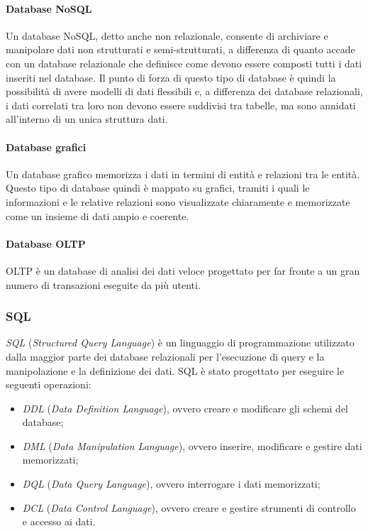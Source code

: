   \paragraph{Database NoSQL}
  Un database NoSQL, detto anche non relazionale, consente di archiviare e manipolare dati non strutturati e 
  semi-strutturati, a differenza di quanto accade con un database relazionale che definisce come devono essere 
  composti tutti i dati inseriti nel database. Il punto di forza di questo tipo di database è quindi la possibilità
  di avere modelli di dati flessibili e, a differenza dei database relazionali, i dati correlati tra loro non devono essere
  suddivisi tra tabelle, ma sono annidati all'interno di un unica struttura dati.
  \paragraph{Database grafici}
  Un database grafico memorizza i dati in termini di entità e relazioni tra le entità. Questo tipo di database quindi 
  è mappato su grafici, tramiti i quali le informazioni e le relative relazioni sono visualizzate chiaramente e memorizzate
  come un insieme di dati ampio e coerente.
  \paragraph{Database OLTP}
  OLTP è un database di analisi dei dati veloce progettato per far fronte a un gran numero di transazioni
  eseguite da più utenti.

  \subsubsection{SQL}
  \textit{SQL} (\textit{Structured Query Language}) è un linguaggio di programmazione utilizzato dalla maggior parte
  dei database relazionali per l'esecuzione di query e la manipolazione e la definizione dei dati.
  SQL è stato progettato per eseguire le seguenti operazioni:
  \begin{itemize}
    \item \textit{DDL} (\textit{Data Definition Language}), ovvero creare e modificare gli schemi del database;
    \item \textit{DML} (\textit{Data Manipulation Language}), ovvero inserire, modificare e gestire dati memorizzati;
    \item \textit{DQL} (\textit{Data Query Language}), ovvero interrogare i dati memorizzati;
    \item \textit{DCL} (\textit{Data Control Language}), ovvero creare e gestire strumenti di controllo e accesso ai dati.
  \end{itemize}
